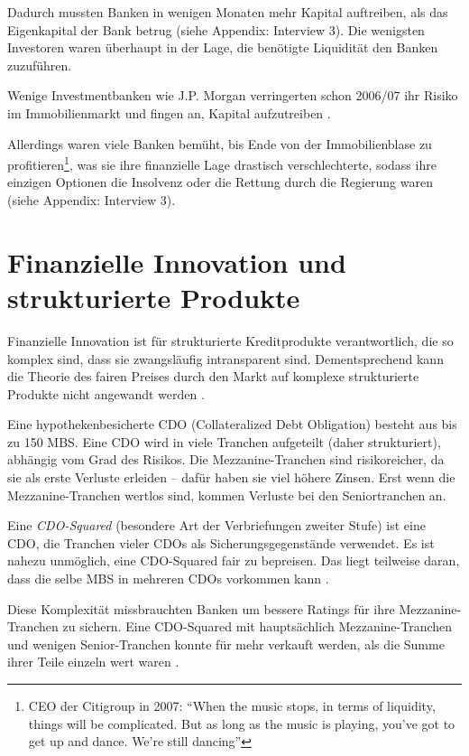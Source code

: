 \documentclass[a4paper,11pt]{report}
\begin{document}
Dadurch mussten Banken in wenigen Monaten
mehr Kapital auftreiben, als das Eigenkapital der
Bank betrug (siehe Appendix: Interview 3).
Die wenigsten Investoren waren \"uberhaupt in der Lage,
die ben\"otigte Liquidit\"at den Banken zuzuf\"uhren.

Wenige Investmentbanken wie J.P. Morgan 
verringerten schon 2006/07 ihr Risiko im Immobilienmarkt
und fingen an, Kapital aufzutreiben \parencite{dimonyt}.

Allerdings waren viele Banken bem\"uht, bis Ende von
der Immobilienblase zu profitieren\footnote{
  CEO der Citigroup in 2007: \foreignquote{english}{When
    the music stops, in terms of liquidity, things will be complicated.
    But as long as the music is playing, you've got to get up and dance.
    We're still dancing}
}, was sie ihre finanzielle Lage drastisch verschlechterte,
sodass ihre einzigen Optionen die Insolvenz oder die Rettung
durch die Regierung waren (siehe Appendix: Interview 3).

\section{Finanzielle Innovation und strukturierte Produkte}
Finanzielle Innovation ist f\"ur strukturierte
Kreditprodukte verantwortlich, die so komplex sind, dass sie
zwangsl\"aufig intransparent sind. Dementsprechend
kann die Theorie des fairen Preises durch den Markt 
auf komplexe strukturierte Produkte nicht angewandt werden \parencite{crottycam}.

Eine hypothekenbesicherte CDO (Collateralized Debt 
Obligation) besteht aus bis zu 150 MBS.
Eine CDO wird in viele
Tranchen aufgeteilt (daher strukturiert),
abh\"angig vom Grad des Risikos.
Die Mezzanine-Tranchen
sind risikoreicher, da sie als erste Verluste
erleiden -- daf\"ur haben sie viel h\"ohere Zinsen.
Erst wenn die Mezzanine-Tranchen wertlos sind,
kommen Verluste bei den Seniortranchen an.

Eine \textit{CDO-Squared} (besondere Art der Verbriefungen zweiter Stufe)
ist eine CDO, die Tranchen vieler CDOs als Sicherungsgegenst\"ande verwendet.
Es ist nahezu unm\"oglich, eine CDO-Squared fair zu bepreisen.
Das liegt teilweise
daran, dass die selbe MBS in mehreren CDOs vorkommen kann \parencite[224--226]{chackocred}.

Diese Komplexit\"at missbrauchten Banken um bessere Ratings f\"ur ihre
Mezzanine-Tranchen zu sichern. Eine CDO-Squared mit haupts\"achlich
Mezzanine-Tranchen und wenigen Senior-Tranchen konnte f\"ur mehr
verkauft werden, als die Summe ihrer Teile einzeln wert waren
\parencite[26--28]{iwregulation}.
\end{document}
